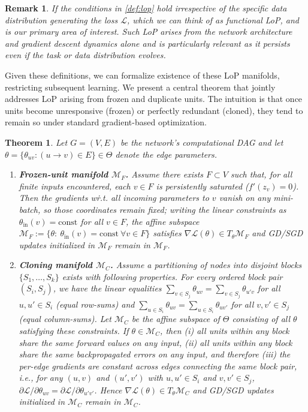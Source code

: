 \documentclass{article}
\newcommand{\Loss}{\mathcal{L}}
\newtheorem{theorem}{Theorem}[section]
\newtheorem{remark}{Remark}[section]
\numberwithin{figure}{section}
\begin{document}
\begin{remark}
If the conditions in \cref{def:lop} hold irrespective of the specific data distribution generating the loss $\Loss$, which we can think of as functional LoP, and is our primary area of interest. Such LoP arises from the network architecture and gradient descent dynamics alone and is particularly relevant as it persists even if the task or data distribution evolves.
\end{remark}
Given these definitions, we can formalize existence of these LoP manifolds, restricting subsequent learning. We present a central theorem that jointly addresses LoP arising from frozen and duplicate units.
The intuition is that once units become unresponsive (frozen) or perfectly redundant (cloned), they tend to remain so under standard gradient-based optimization. 
\begin{theorem}
\label{prop:frozen_duplicate_lop}
Let $G=(V,E)$ be the network’s computational DAG and let $\theta=\{\theta_{uv}:(u\to v)\in E\}\in\Theta$ denote the edge parameters.
\begin{enumerate}
\item \textbf{Frozen-unit manifold $\mathcal{M}_F$.}
Assume there exists $F\subset V$ such that, for all finite inputs encountered, each $v\in F$ is persistently saturated ($f'(z_v)=0$). Then the gradients w\.r.t. all incoming parameters to $v$ vanish on any mini-batch, so those coordinates remain fixed; writing the linear constraints as $\theta_{\mathrm{in}}(v)=\mathrm{const}$ for all $v\in F$, the affine subspace $\mathcal{M}_F:=\{\theta:\ \theta_{\mathrm{in}}(v)=\mathrm{const}\ \forall v\in F\}$ satisfies $\nabla\mathcal{L}(\theta)\in T_\theta\mathcal{M}_F$ and GD/SGD updates initialized in $\mathcal{M}_F$ remain in $\mathcal{M}_F$.
\item \textbf{Cloning manifold $\mathcal{M}_C$.}
Assume a partitioning of nodes into disjoint blocks $\{S_1,\dots,S_k\}$ exists with following properties. For every ordered block pair $(S_i,S_j)$, we have the linear equalities $\sum_{v\in S_j}\theta_{uv}=\sum_{v\in S_j}\theta_{u'v}$ for all $u,u'\in S_i$ (equal row-sums) and $\sum_{u\in S_i}\theta_{uv}=\sum_{u\in S_i}\theta_{uv'}$ for all $v,v'\in S_j$ (equal column-sums). Let $\mathcal{M}_C$ be the affine subspace of $\Theta$ consisting of all $\theta$ satisfying these constraints. If $\theta\in\mathcal{M}_C$, then (i) all units within any block share the same forward values on any input, (ii) all units within any block share the same backpropagated errors on any input, and therefore (iii) the per-edge gradients are constant across edges connecting the same block pair, i.e., for any $(u,v)$ and $(u',v')$ with $u,u'\in S_i$ and $v,v'\in S_j$, $\partial \mathcal{L}/\partial \theta_{uv}=\partial \mathcal{L}/\partial \theta_{u'v'}$. Hence $\nabla\mathcal{L}(\theta)\in T_\theta\mathcal{M}_C$ and GD/SGD updates initialized in $\mathcal{M}_C$ remain in $\mathcal{M}_C$.
\end{enumerate}
\end{theorem}
\end{document}
